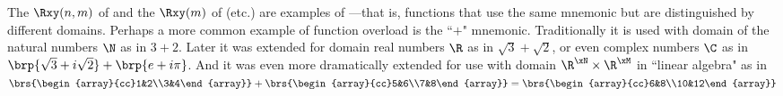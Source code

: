 \begin{remark}
  The $\Rxy(n,m)$ of  and the $\Rxy(m)$ of  (etc.) are examples
  of ---that is, functions that use the same
  mnemonic but are distinguished by different domains.
  Perhaps a more common example of function overload is the ``$+$" mnemonic.
  Traditionally it is used with domain of the natural numbers $\N$ as in $3+2$.
  Later it was extended for domain real numbers $\R$ as in $\sqrt{3}+\sqrt{2}$,
  or even complex numbers $\C$ as in $\brp{\sqrt{3}+i\sqrt{2}}+\brp{e+i\pi}$.
  And it was even more dramatically extended for use with domain $\R^\xN\times\R^\xM$
  in ``linear algebra" as in
  \\\indentx$
    \brs{\begin{array}{cc}1&2\\3&4\end{array}} +
    \brs{\begin{array}{cc}5&6\\7&8\end{array}} =
    \brs{\begin{array}{cc}6&8\\10&12\end{array}}
   $
\end{remark}

